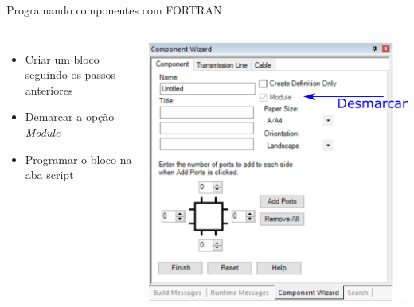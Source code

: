\begin{frame}{Programando componentes com FORTRAN}
\centering

\begin{columns}


\begin{itemize}
\item Criar um bloco seguindo os passos anteriores
\vspace*{1cm}
\item Demarcar a opção {\it Module}
\vspace*{1cm}
\item Programar o bloco na aba script
\end{itemize}

\includegraphics[width=0.75\linewidth]{./figuras/Componentes/componenteFortran}

\end{columns}




\end{frame}




